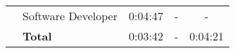 \begin{table}[tb]
\begin{tabular}{llrrr}
                              & Software Developer   & 0:04:47                                                           & \multicolumn{1}{c}{-}                                                   & \multicolumn{1}{c}{-}                                         \\
                              & \textbf{Total}       & 0:03:42                                                           & \multicolumn{1}{c}{-}                                                   & 0:04:21                                                       \\ \hline
    \end{tabular}
    \end{table}
  
  
